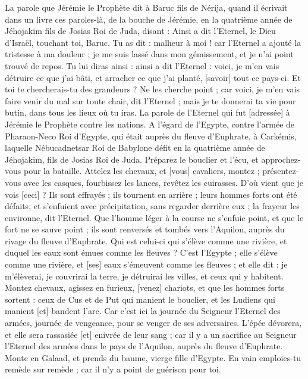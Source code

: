 \begin{multicols}{2}
\VerseOne{}La parole que Jérémie le Prophète dit à Baruc fils de Nérija, quand il écrivait dans un livre ces paroles-là, de la bouche de Jérémie, en la quatrième année de Jéhojakim fils de Josias Roi de Juda, disant :
Ainsi a dit l'Eternel, le Dieu d'Israël, touchant toi, Baruc.
Tu as dit : malheur à moi ! car l'Eternel a ajouté la tristesse à ma douleur ; je me suis lassé dans mon gémissement, et je n'ai point trouvé de repos.
Tu lui diras ainsi : ainsi a dit l'Eternel : voici, je m'en vais détruire ce que j'ai bâti, et arracher ce que j'ai planté, [savoir] tout ce pays-ci.
Et toi te chercherais-tu des grandeurs ? Ne les cherche point ; car voici, je m'en vais faire venir du mal sur toute chair, dit l'Eternel ; mais je te donnerai ta vie pour butin, dans tous les lieux où tu iras.
\VerseOne{}La parole de l'Eternel qui fut [adressée] à Jérémie le Prophète contre les nations.
A l'égard de l'Egypte, contre l'armée de Pharaon-Neco Roi d'Egypte, qui était auprès du fleuve d'Euphrate, à Carkémis, laquelle Nébucadnetsar Roi de Babylone défit en la quatrième année de Jéhojakim, fils de Josias Roi de Juda.
Préparez le bouclier et l'écu, et approchez-vous pour la bataille.
Attelez les chevaux, et [vous] cavaliers, montez ; présentez-vous avec les casques, fourbissez les lances, revêtez les cuirasses.
D'où vient que je vois [ceci] ? Ils sont effrayés ; ils tournent en arrière ; leurs hommes forts ont été défaits, et s'enfuient avec précipitation, sans regarder derrière eux ; la frayeur les environne, dit l'Eternel.
Que l'homme léger à la course ne s'enfuie point, et que le fort ne se sauve point ; ils sont renversés et tombés vers l'Aquilon, auprès du rivage du fleuve d'Euphrate.
Qui est celui-ci qui s'élève comme une rivière, et duquel les eaux sont émues comme les fleuves ?
C'est l'Egypte ; elle s'élève comme une rivière, et [ses] eaux s'émeuvent comme les fleuves ; et elle dit : je m'élèverai, je couvrirai la terre, je détruirai les villes, et ceux qui y habitent.
Montez chevaux, agissez en furieux, [venez] chariots, et que les hommes forts sortent : ceux de Cus et de Put qui manient le bouclier, et les Ludiens qui manient [et] bandent l'arc.
Car c'est ici la journée du Seigneur l'Eternel des armées, journée de vengeance, pour se venger de ses adversaires. L'épée dévorera, et elle sera rassasiée [et] enivrée de leur sang ; car il y a un sacrifice au Seigneur l'Eternel des armées dans le pays de l'Aquilon, auprès du fleuve d'Euphrate.
Monte en Galaad, et prends du baume, vierge fille d'Egypte. En vain emploies-tu remède sur remède ; car il n'y a point de guérison pour toi.

\end{multicols}
